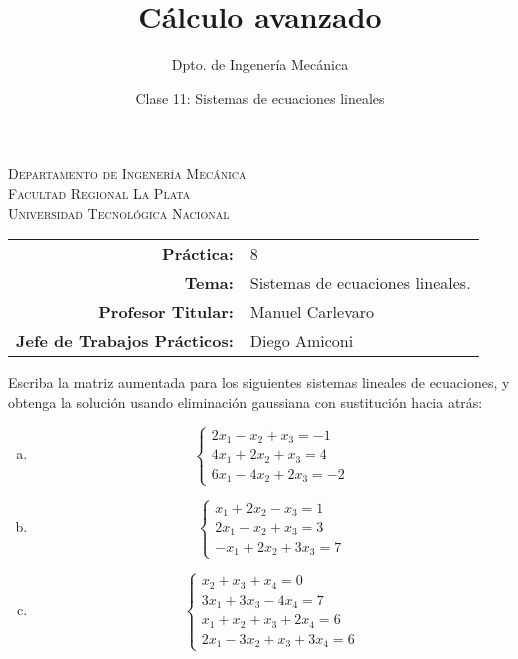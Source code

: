 \documentclass[11pt]{article}
\title{Cálculo avanzado}
\author{Dpto. de Ingenería Mecánica}
\date{Clase 11: Sistemas de ecuaciones lineales}
\begin{document}

\begin{center}
\end{center} 

\begin{center}
\vspace{\baselineskip}
\Large{\textsc{Departamento de Ingenería Mecánica}} \\
\textsc{Facultad Regional La Plata} \\
\textsc{Universidad Tecnológica Nacional}
\end{center}


\begin{center}
\begin{tabular}{r l}
    \textbf{Práctica:} & 8 \\
 \textbf{Tema:} & Sistemas de ecuaciones lineales. \\
 \textbf{Profesor Titular:} & Manuel Carlevaro \\
 \textbf{Jefe de Trabajos Prácticos:} & Diego Amiconi \\
\end{tabular}\end{center}

\vspace{1em}

\begin{question} %
Escriba la matriz aumentada para los siguientes sistemas lineales de ecuaciones, y obtenga la solución usando eliminación gaussiana con sustitución hacia atrás:
\begin{enumerate}[a)]
    \item \[ \begin{cases} 2 x_1 - x_2 + x_3 = -1 \\
                       4 x_1 + 2 x_2 + x_3 = 4 \\ 
                       6 x_1 - 4 x_2 + 2 x_3 = -2 
        \end{cases} \]
    \item \[ \begin{cases} x_1 + 2 x_2 - x_3 = 1 \\
                      2 x_1 - x_2 + x_3 = 3 \\ 
                      -x_1 + 2 x_2 + 3 x_3 = 7 
        \end{cases} \]
    \item \[ \begin{cases} x_2 + x_3 + x_4 = 0 \\
                      3 x_1 + 3 x_3 - 4 x_4 = 7 \\ 
                      x_1 + x_2 + x_3 + 2 x_4 = 6 \\
                      2 x_1 - 3 x_2 + x_3 + 3 x_4 = 6
        \end{cases} \]
\end{enumerate}
\end{question}
\end{document}
